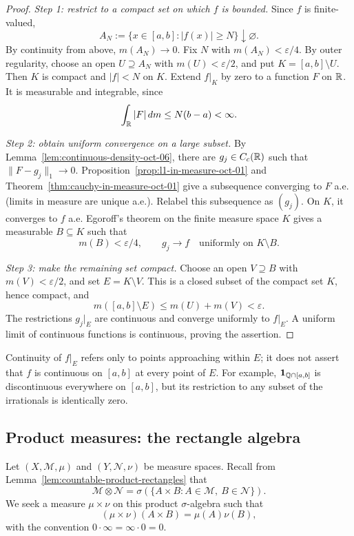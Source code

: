 \begin{proof}
  \emph{Step 1: restrict to a compact set on which $f$ is bounded.}
  Since $f$ is finite-valued,
  \[
    A_N:=\{x\in[a,b]:|f(x)|\geq N\}\downarrow\varnothing.
  \]
  By continuity from above, $m(A_N)\to0$. Fix $N$ with
  $m(A_N)<\varepsilon/4$. By outer regularity, choose an open
  $U\supseteq A_N$ with $m(U)<\varepsilon/2$, and put
  $K=[a,b]\setminus U$. Then $K$ is compact and $|f|<N$ on $K$.
  Extend $f|_K$ by zero to a function $F$ on $\mathbb{R}$. It is
  measurable and integrable, since
  \[
    \int_{\mathbb{R}}|F|\,dm\leq N(b-a)<\infty.
  \]

  \emph{Step 2: obtain uniform convergence on a large subset.}
  By Lemma~\ref{lem:continuous-density-oct-06}, there are
  $g_j\in C_c(\mathbb{R})$ such that $\|F-g_j\|_1\to0$.
  Proposition~\ref{prop:l1-in-measure-oct-01} and
  Theorem~\ref{thm:cauchy-in-measure-oct-01} give a subsequence
  converging to $F$ a.e. (limits in measure are unique a.e.).
  Relabel this subsequence as $(g_j)$. On $K$, it converges to $f$
  a.e. Egoroff's theorem on the finite measure space $K$ gives a
  measurable $B\subseteq K$ such that
  \[
    m(B)<\varepsilon/4,\qquad
    g_j\longrightarrow f\quad\text{uniformly on }K\setminus B.
  \]

  \emph{Step 3: make the remaining set compact.}
  Choose an open $V\supseteq B$ with $m(V)<\varepsilon/2$, and
  set $E=K\setminus V$. This is a closed subset of the compact
  set $K$, hence compact, and
  \[
    m([a,b]\setminus E)
      \leq m(U)+m(V)<\varepsilon.
  \]
  The restrictions $g_j|_E$ are continuous and converge uniformly
  to $f|_E$. A uniform limit of continuous functions is continuous,
  proving the assertion.
\end{proof}

\begin{remark}
  Continuity of $f|_E$ refers only to points approaching within $E$;
  it does not assert that $f$ is continuous on $[a,b]$ at every
  point of $E$. For example, $\mathbf 1_{\mathbb{Q}\cap[a,b]}$ is
  discontinuous everywhere on $[a,b]$, but its restriction to any
  subset of the irrationals is identically zero.
\end{remark}

\subsection{Product measures: the rectangle algebra}

Let $(X,\mathcal M,\mu)$ and $(Y,\mathcal N,\nu)$ be measure
spaces. Recall from Lemma~\ref{lem:countable-product-rectangles} that
\[
  \mathcal M\otimes\mathcal N
    =\sigma(\{A\times B:A\in\mathcal M,\ B\in\mathcal N\}).
\]
We seek a measure $\mu\times\nu$ on this product $\sigma$-algebra
such that
\[
  (\mu\times\nu)(A\times B)=\mu(A)\nu(B),
\]
with the convention $0\cdot\infty=\infty\cdot0=0$.

